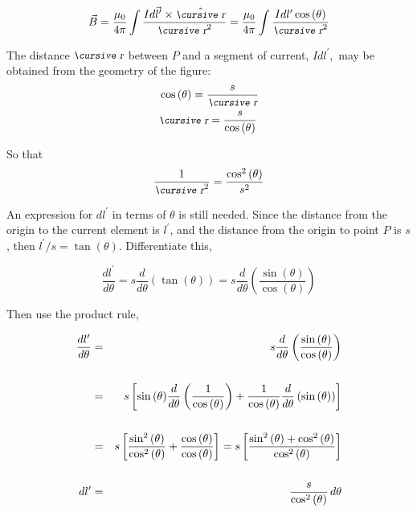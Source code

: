 \documentclass[12pt]{article}
\begin{document}
\begin{flushleft}
\begin{equation*}
\vec{B}  = \frac{ \mu_{0} }{4\pi} \int \frac{ Id\vec{l}^{\prime} \times  \hat{\text{\small\slshape\cursive r}}}{\text{\small\slshape\cursive r}^{2}}  = \frac{ \mu_{0} }{4\pi} \int \frac{ Idl^{\prime} \cos{(\theta)} }{\text{\small\slshape\cursive r}^{2}} 
\end{equation*}

The distance $\text{\small\slshape\cursive r}$ between $P$ and a segment of current, $Idl^{\prime},$ may be obtained from the geometry of the figure:
\begin{equation*}
\begin{aligned}
& \cos{(\theta)}= \frac{s}{\text{\small\slshape\cursive r}} \\
& \text{\small\slshape\cursive r} = \frac{s}{\cos{(\theta)}}
\end{aligned}
\end{equation*}

So that
\[
\frac{1}{\text{\small\slshape\cursive r}^{2}} =\frac{\cos^{2}{(\theta)}}{s^{2}}
\]

An expression for $dl^{\prime}$ in terms of $\theta$ is still needed.  Since the distance from the origin to the current element is $l^{\prime}$, and the distance from the origin to point $P$ is $s$, then $l^{\prime}/s=\tan{(\theta)}$.  Differentiate this,

\[
\frac{dl^{\prime}}{d\theta}  =  s\frac{d}{d\theta}\left( \tan{(\theta)} \right)  = s\frac{d}{d\theta} \left( \frac{\sin{(\theta)}}{\cos{(\theta)}} \right) 
\]

Then use the product rule,

\begin{eqnarray*}
\frac{dl^{\prime}}{d\theta} & = & s\frac{d}{d\theta} \left( \frac{\sin{(\theta)}}{\cos{(\theta)}} \right) \\
 \vspace{.03in}\\
 & = & s\left[ \sin{(\theta)} \frac{d}{d\theta}\left( \frac{1}{\cos{(\theta)}}\right) + \frac{1}{\cos{(\theta)}}\frac{d}{d\theta} \left( \sin{(\theta)} \right) \right] \\
 \vspace{.03in}\\
 & = & s\left[ \frac{\sin^{2}{(\theta)}}{\cos^{2}{(\theta)}}  + \frac{\cos{(\theta)}}{\cos{(\theta)}} \right] 
 = s\left[ \frac{\sin^{2}{(\theta)}+\cos^{2}{(\theta)} }{\cos^{2}{(\theta)}} \right] \\
  \vspace{.03in}\\
dl^{\prime} & = & \frac{s}{\cos^{2}{(\theta)}} \, d\theta
\end{eqnarray*}


\end{flushleft}
\end{document}
